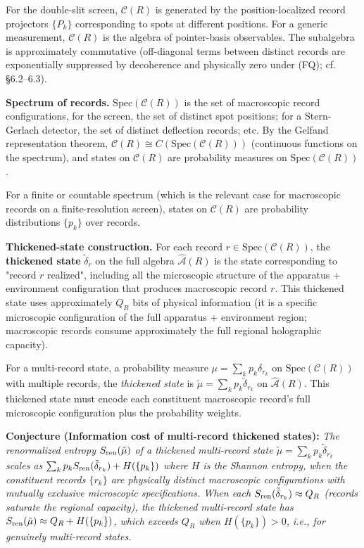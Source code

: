 \documentclass[11pt,a4paper]{article}
\begin{document}
For the double-slit screen, $\mathcal{C}(R)$ is generated by the position-localized record projectors $\{P_k\}$ corresponding to spots at different positions. For a generic measurement, $\mathcal{C}(R)$ is the algebra of pointer-basis observables. The subalgebra is approximately commutative (off-diagonal terms between distinct records are exponentially suppressed by decoherence and physically zero under (FQ); cf. §6.2–6.3).

\textbf{Spectrum of records.} $\mathrm{Spec}(\mathcal{C}(R))$ is the set of macroscopic record configurations, for the screen, the set of distinct spot positions; for a Stern-Gerlach detector, the set of distinct deflection records; etc. By the Gelfand representation theorem, $\mathcal{C}(R) \cong C(\mathrm{Spec}(\mathcal{C}(R)))$ (continuous functions on the spectrum), and states on $\mathcal{C}(R)$ are probability measures on $\mathrm{Spec}(\mathcal{C}(R))$.

For a finite or countable spectrum (which is the relevant case for macroscopic records on a finite-resolution screen), states on $\mathcal{C}(R)$ are probability distributions $\{p_k\}$ over records.

\textbf{Thickened-state construction.} For each record $r \in \mathrm{Spec}(\mathcal{C}(R))$, the \textbf{thickened state} $\tilde{\delta}_r$ on the full algebra $\hat{\mathcal{A}}(R)$ is the state corresponding to "record $r$ realized", including all the microscopic structure of the apparatus + environment configuration that produces macroscopic record $r$. This thickened state uses approximately $Q_R$ bits of physical information (it is a specific microscopic configuration of the full apparatus + environment region; macroscopic records consume approximately the full regional holographic capacity).

For a multi-record state, a probability measure $\mu = \sum_k p_k \delta_{r_k}$ on $\mathrm{Spec}(\mathcal{C}(R))$ with multiple records, the \emph{thickened state} is $\tilde{\mu} = \sum_k p_k \tilde{\delta}_{r_k}$ on $\hat{\mathcal{A}}(R)$. This thickened state must encode each constituent macroscopic record's full microscopic configuration plus the probability weights.

\textbf{Conjecture (Information cost of multi-record thickened states):} \emph{The renormalized entropy $S_{\rm ren}(\tilde{\mu})$ of a thickened multi-record state $\tilde{\mu} = \sum_k p_k \tilde{\delta}_{r_k}$ scales as $\sum_k p_k S_{\rm ren}(\tilde{\delta}_{r_k}) + H(\{p_k\})$ where $H$ is the Shannon entropy, when the constituent records $\{r_k\}$ are physically distinct macroscopic configurations with mutually exclusive microscopic specifications. When each $S_{\rm ren}(\tilde{\delta}_{r_k}) \approx Q_R$ (records saturate the regional capacity), the thickened multi-record state has $S_{\rm ren}(\tilde{\mu}) \approx Q_R + H(\{p_k\})$, which exceeds $Q_R$ when $H(\{p_k\}) > 0$, i.e., for genuinely multi-record states.}
\end{document}
